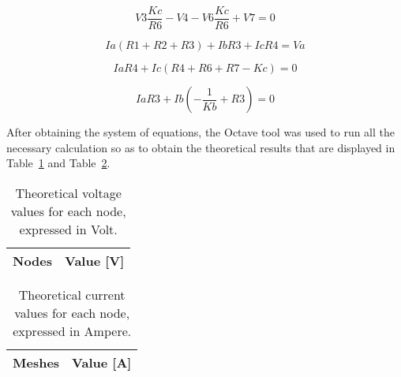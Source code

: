 \begin{equation}
  V3\frac{Kc}{R6} - V4 - V6\frac{Kc}{R6} + V7 = 0
\end{equation}

\begin{equation}
  Ia(R1+R2+R3) + IbR3 + IcR4 = Va
\end{equation}

\begin{equation}
  IaR4 + Ic(R4+R6+R7-Kc) = 0
\end{equation}

\begin{equation}
  IaR3 + Ib(-\frac{1}{Kb}+R3) = 0
\end{equation}

After obtaining the system of equations, the Octave tool was used to run all the necessary calculation so as to obtain the theoretical results that are displayed in Table~\ref{tab:nos} and Table~\ref{tab:malhas}.

\begin{table}[h]
  \centering
  \begin{tabular}{|l|r|}
    \hline    
    {\bf Nodes} & {\bf Value [V]} \\ \hline
    
  \end{tabular}
  \caption{Theoretical voltage values for each node, expressed in Volt.}
  \label{tab:nos}
\end{table}

\begin{table}[h]
  \centering
  \begin{tabular}{|l|r|}
    \hline    
    {\bf Meshes} & {\bf Value [A]} \\ \hline
    
  \end{tabular}
  \caption{Theoretical current values for each node, expressed in Ampere.}
  \label{tab:malhas}
\end{table}




